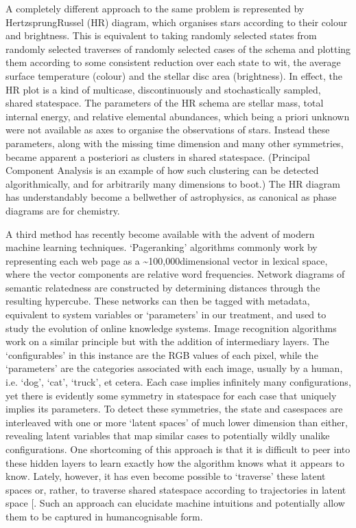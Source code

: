 \documentclass[letterpaper,10pt,english]{jupyterBook}
\begin{document}
\sphinxAtStartPar
A completely different approach to the same problem is represented by Hertzsprung\sphinxhyphen{}Russel (HR) diagram, which organises stars according to their colour and brightness. This is equivalent to taking randomly selected states from randomly selected traverses of randomly selected cases of the schema and plotting them according to some consistent reduction over each state \sphinxhyphen{} to wit, the average surface temperature (colour) and the stellar disc area (brightness). In effect, the HR plot is a kind of multi\sphinxhyphen{}case, discontinuously and stochastically sampled, shared state\sphinxhyphen{}space. The parameters of the HR schema are stellar mass, total internal energy, and relative elemental abundances, which \sphinxhyphen{} being a priori unknown \sphinxhyphen{} were not available as axes to organise the observations of stars. Instead these parameters, along with the missing time dimension and many other symmetries, became apparent a posteriori as clusters in shared state\sphinxhyphen{}space. (Principal Component Analysis is an example of how such clustering can be detected algorithmically, and for arbitrarily many dimensions to boot.) The HR diagram has understandably become a bellwether of astrophysics, as canonical as phase diagrams are for chemistry.

\sphinxAtStartPar
A third method has recently become available with the advent of modern machine learning techniques. ‘Page\sphinxhyphen{}ranking’ algorithms commonly work by representing each web page as a \textasciitilde{}100,000\sphinxhyphen{}dimensional vector in lexical space, where the vector components are relative word frequencies. Network diagrams of semantic relatedness are constructed by determining distances through the resulting hypercube. These networks can then be tagged with metadata, equivalent to system variables or ‘parameters’ in our treatment, and used to study the evolution of online knowledge systems. Image recognition algorithms work on a similar principle but with the addition of intermediary layers. The ‘configurables’ in this instance are the RGB values of each pixel, while the ‘parameters’ are the categories associated with each image, usually by a human, i.e. ‘dog’, ‘cat’, ‘truck’, et cetera. Each case implies infinitely many configurations, yet there is evidently some symmetry in state\sphinxhyphen{}space for each case that uniquely implies its parameters. To detect these symmetries, the state\sphinxhyphen{} and case\sphinxhyphen{}spaces are interleaved with one or more ‘latent spaces’ of much lower dimension than either, revealing latent variables that map similar cases to potentially wildly unalike configurations. One shortcoming of this approach is that it is difficult to peer into these hidden layers to learn exactly how the algorithm knows what it appears to know. Lately, however, it has even become possible to ‘traverse’ these latent spaces \sphinxhyphen{} or, rather, to traverse shared state\sphinxhyphen{}space according to trajectories in latent space {[}\sphinxcite{references:id55}{]}. Such an approach can elucidate machine intuitions and potentially allow them to be captured in human\sphinxhyphen{}cognisable form.
\end{document}

